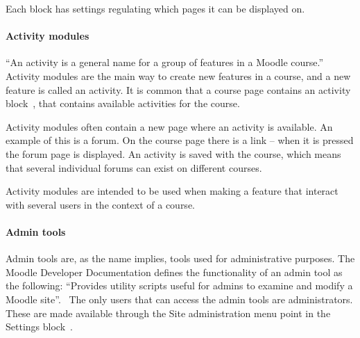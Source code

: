 Each block has settings regulating which pages it can be displayed on. %




\paragraph{Activity modules}
\label{par:activitymodules}
``An activity is a general name for a group of features in a Moodle course.''~\cite{activity} 
Activity modules are the main way to create new features in a course, and a new feature is called an activity. 
It is common that a course page contains an activity block~\cite{activityblock}, that contains available activities for the course. 

Activity modules often contain a new page where an activity is available. 
An example of this is a forum. 
On the course page there is a link -- when it is pressed the forum page is displayed. 
An activity is saved with the course, which means that several individual forums can exist on different courses.

Activity modules are intended to be used when making a feature that interact with several users in the context of a course.  

\paragraph{Admin tools}
\label{par:admintool}
Admin tools are, as the name implies, tools used for administrative purposes. 
The Moodle Developer Documentation defines the functionality of an admin tool as the following: 
``Provides utility scripts useful for admins to examine and modify a Moodle site''.~\cite{plugin} 
The only users that can access the admin tools are administrators. 
These are made available through the Site administration menu point in the Settings block~\cite{moodleadmintools}.


